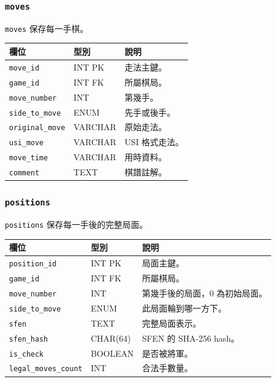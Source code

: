 \documentclass[12pt,a4paper,fontset=none]{ctexart}
\begin{document}
\subsubsection{\texttt{moves}}

\texttt{moves} 保存每一手棋。

\begin{longtable}{p{}p{}p{}}
\toprule
\textbf{欄位} & \textbf{型別} & \textbf{說明}\\
\midrule
\endhead
\texttt{move\_id} & INT PK & 走法主鍵。\\
\texttt{game\_id} & INT FK & 所屬棋局。\\
\texttt{move\_number} & INT & 第幾手。\\
\texttt{side\_to\_move} & ENUM & 先手或後手。\\
\texttt{original\_move} & VARCHAR & 原始走法。\\
\texttt{usi\_move} & VARCHAR & USI 格式走法。\\
\texttt{move\_time} & VARCHAR & 用時資料。\\
\texttt{comment} & TEXT & 棋譜註解。\\
\bottomrule
\end{longtable}

\subsubsection{\texttt{positions}}

\texttt{positions} 保存每一手後的完整局面。

\begin{longtable}{p{}p{}p{}}
\toprule
\textbf{欄位} & \textbf{型別} & \textbf{說明}\\
\midrule
\endhead
\texttt{position\_id} & INT PK & 局面主鍵。\\
\texttt{game\_id} & INT FK & 所屬棋局。\\
\texttt{move\_number} & INT & 第幾手後的局面，0 為初始局面。\\
\texttt{side\_to\_move} & ENUM & 此局面輪到哪一方下。\\
\texttt{sfen} & TEXT & 完整局面表示。\\
\texttt{sfen\_hash} & CHAR(64) & SFEN 的 SHA-256 hash。\\
\texttt{is\_check} & BOOLEAN & 是否被將軍。\\
\texttt{legal\_moves\_count} & INT & 合法手數量。\\
\bottomrule
\end{longtable}
\end{document}
